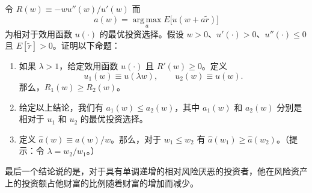 
\begin{problem}
 令 $R(w)\equiv -wu''(w)/u'(w)$ 而
\[
    a(w)=\operatorname*{arg\,max}_{a} E\bigl[u(w+a\tilde{r})\bigr]
\]
为相对于效用函数 $u(\cdot)$ 的最优投资选择。假设 $w>0$、$u'(\cdot)>0$、$u''(\cdot)\le 0$ 且 $E[\tilde{r}]>0$。证明以下命题：
\begin{enumerate}[label=(\alph*)]
    \item 如果 $\lambda>1$，给定效用函数 $u(\cdot)$ 且 $R'(w)\ge 0$。定义
    \[
        u_{1}(w)\equiv u(\lambda w),\qquad u_{2}(w)\equiv u(w).
    \]
    那么，$R_{1}(w)\ge R_{2}(w)$。
    \item 给定以上结论，我们有 $a_{1}(w)\le a_{2}(w)$，其中 $a_{1}(w)$ 和 $a_{2}(w)$ 分别是相对于 $u_{1}$ 和 $u_{2}$ 的最优投资选择。
    \item 定义 $\widehat{a}(w)\equiv a(w)/w$。那么，对于 $w_{1}\le w_{2}$ 有 $\widehat{a}(w_{1})\ge\widehat{a}(w_{2})$。（提示：令 $\lambda=w_{2}/w_{1}$。）
\end{enumerate}
最后一个结论说的是，对于具有单调递增的相对风险厌恶的投资者，他在风险资产上的投资额占他财富的比例随着财富的增加而减少。
\end{problem}
